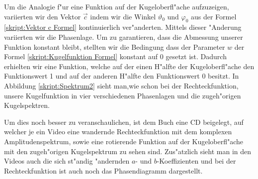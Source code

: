 \begin{refsection}
Um die Analogie f"ur eine Funktion auf der Kugeloberfl"ache aufzuzeigen, 
variierten wir den Vektor $\vec{c}$ indem wir die Winkel $\vartheta_0$
und $\varphi_0$ aus der Formel \ref{skript:Vektor c Formel} 
kontinuierlich ver"anderten. 
Mittels dieser "Anderung variierten wir die Phasenlage. 
Um zu garantieren, dass die Abmessung unserer Funktion konstant bleibt, 
stellten wir die Bedingung dass der Parameter $w$ der Formel 
\ref{skript:Kugelfunktion Formel} konstant auf 0 gesetzt ist. 
Dadurch erhielten wir eine Funktion, welche auf der einen 
H"alfte der Kugeloberfl"ache den Funktionswert 1 und auf der 
anderen H"alfte den Funktionswert 0 besitzt. In Abbildung 
\ref{skript:Spektrum2} sieht man,wie schon bei der Rechteckfunktion, 
unsere Kugelfunktion in vier verschiedenen Phasenlagen und die 
zugeh"origen Kugelspektren.

Um dies noch besser zu veranschaulichen, ist dem Buch eine CD 
beigelegt, auf welcher je ein Video eine wandernde 
Rechteckfunktion mit dem komplexen Amplitudenspektrum, sowie eine 
rotierende Funktion auf der Kugeloberfl"ache mit den zugeh"origen 
Kugelspektrum zu sehen sind. Zus"atzlich sieht man in den Videos auch
die sich st"andig "andernden $a$- und $b$-Koeffizienten und bei der 
Rechteckfunktion ist auch noch das Phasendiagramm dargestellt.


\end{refsection}
